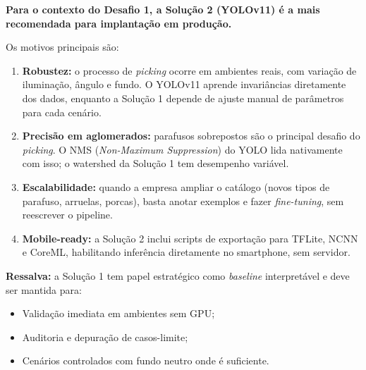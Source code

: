 \documentclass[12pt,a4paper]{article}
\begin{document}
\begin{tcolorbox}[veredicto={Recomenda\c{c}\~ao T\'ecnica}]

\textbf{Para o contexto do Desafio 1, a Solu\c{c}\~ao 2 (YOLOv11) \'e a mais
recomendada para implanta\c{c}\~ao em produ\c{c}\~ao.}

\medskip
Os motivos principais s\~ao:

\begin{enumerate}[leftmargin=*, label=\arabic*.]
  \item \textbf{Robustez:} o processo de \emph{picking} ocorre em ambientes reais, com
        varia\c{c}\~ao de ilumina\c{c}\~ao, \^angulo e fundo. O YOLOv11 aprende
        invariâncias diretamente dos dados, enquanto a Solu\c{c}\~ao 1 depende de
        ajuste manual de par\^ametros para cada cen\'ario.

  \item \textbf{Precis\~ao em aglomerados:} parafusos sobrepostos s\~ao o principal
        desafio do \emph{picking}. O NMS (\emph{Non-Maximum Suppression}) do YOLO
        lida nativamente com isso; o watershed da Solu\c{c}\~ao 1 tem desempenho
        vari\'avel.

  \item \textbf{Escalabilidade:} quando a empresa ampliar o cat\'alogo (novos tipos
        de parafuso, arruelas, porcas), basta anotar exemplos e fazer
        \emph{fine-tuning}, sem reescrever o pipeline.

  \item \textbf{Mobile-ready:} a Solu\c{c}\~ao 2 inclui scripts de exporta\c{c}\~ao
        para TFLite, NCNN e CoreML, habilitando infer\^encia diretamente no
        smartphone, sem servidor.
\end{enumerate}

\medskip
\textbf{Ressalva:} a Solu\c{c}\~ao 1 tem papel estrat\'egico como
\emph{baseline} interpret\'avel e deve ser mantida para:
\begin{itemize}[leftmargin=*, noitemsep]
  \item Valida\c{c}\~ao imediata em ambientes sem GPU;
  \item Auditoria e depura\c{c}\~ao de casos-limite;
  \item Cen\'arios controlados com fundo neutro onde \'e suficiente.
\end{itemize}

\end{tcolorbox}

\end{document}
